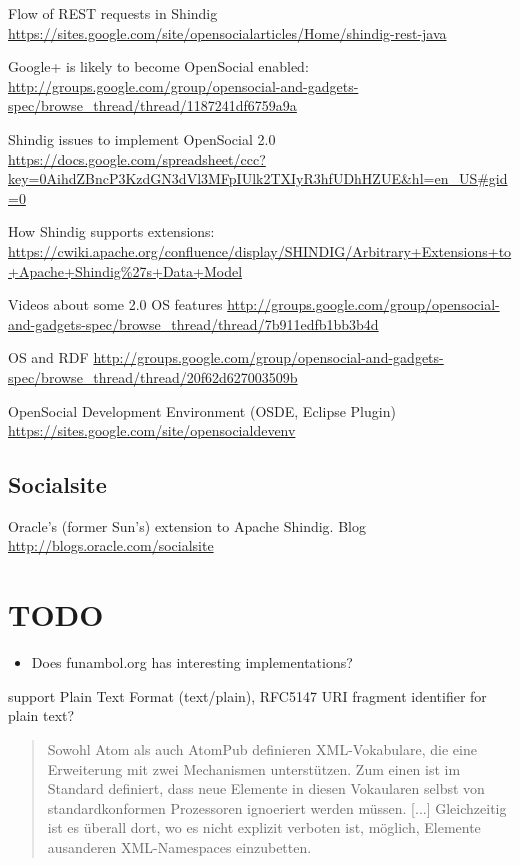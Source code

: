 \documentclass[12pt,a4paper]{scrartcl}		%
\begin{document}
Flow of REST requests in Shindig \url{https://sites.google.com/site/opensocialarticles/Home/shindig-rest-java}

Google+ is likely to become OpenSocial enabled: \url{http://groups.google.com/group/opensocial-and-gadgets-spec/browse_thread/thread/1187241df6759a9a}

Shindig issues to implement OpenSocial 2.0 \url{https://docs.google.com/spreadsheet/ccc?key=0AihdZBncP3KzdGN3dVl3MFpIUlk2TXIyR3hfUDhHZUE&hl=en_US#gid=0}

How Shindig supports extensions: \url{https://cwiki.apache.org/confluence/display/SHINDIG/Arbitrary+Extensions+to+Apache+Shindig%27s+Data+Model}

Videos about some 2.0 OS features \url{http://groups.google.com/group/opensocial-and-gadgets-spec/browse_thread/thread/7b911edfb1bb3b4d}

OS and RDF \url{http://groups.google.com/group/opensocial-and-gadgets-spec/browse_thread/thread/20f62d627003509b}

OpenSocial Development Environment (OSDE, Eclipse Plugin)  \url{https://sites.google.com/site/opensocialdevenv}

\subsection{Socialsite}

Oracle's (former Sun's) extension to Apache Shindig. Blog \url{http://blogs.oracle.com/socialsite}

\section{TODO}
\begin{itemize}
\item Does funambol.org has interesting implementations?
\end{itemize}



support Plain Text Format (text/plain), RFC5147 URI fragment identifier for plain text?

\begin{quote}
  Sowohl Atom als auch AtomPub definieren XML-Vokabulare, die eine Erweiterung
  mit zwei Mechanismen unterstützen. Zum einen ist im Standard definiert, dass
  neue Elemente in diesen Vokaularen selbst von standardkonformen Prozessoren
  ignoeriert werden müssen. [...] Gleichzeitig ist es überall dort, wo es nicht
  explizit verboten ist, möglich, Elemente ausanderen XML-Namespaces
  einzubetten.
\end{quote}\cite[p. 102]{Tilkov2011}


{}

\end{document}
